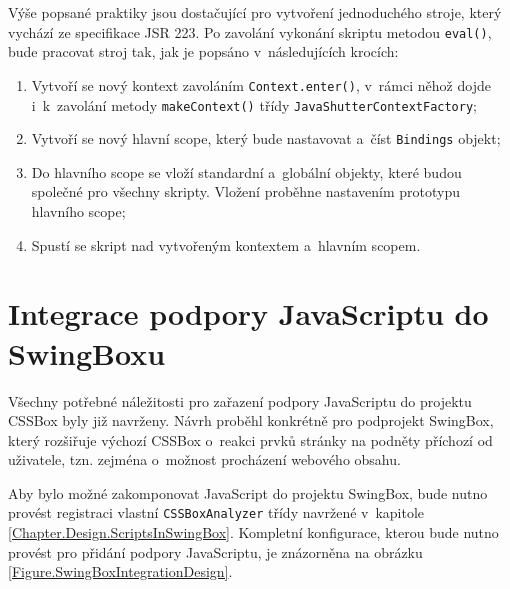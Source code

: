 Výše popsané praktiky jsou dostačující pro vytvoření jednoduchého stroje, který vychází ze specifikace JSR 223.  Po zavolání vykonání skriptu metodou \texttt{eval()}, bude pracovat stroj tak, jak je popsáno v~následujících krocích:  

\begin{enumerate}
  \item	Vytvoří se nový kontext zavoláním \texttt{Context.enter()}, v~rámci něhož dojde i~k~zavolání metody \texttt{makeContext()} třídy \texttt{JavaShutterContextFactory};
  \item	Vytvoří se nový hlavní scope, který bude nastavovat a~číst \texttt{Bindings} objekt;
  \item	Do hlavního scope  se vloží standardní a~globální objekty, které budou společné pro všechny skripty. Vložení proběhne nastavením prototypu hlavního scope;
  \item	Spustí se skript nad vytvořeným kontextem a~hlavním scopem.
\end{enumerate}

\section{Integrace podpory JavaScriptu do SwingBoxu}
\label{Chapter.Design.SwingBoxIntegration}

Všechny potřebné náležitosti pro zařazení podpory JavaScriptu do projektu CSSBox byly již navrženy. Návrh proběhl konkrétně pro podprojekt SwingBox, který rozšiřuje výchozí  CSSBox o~reakci prvků stránky na podněty příchozí od uživatele, tzn. zejména o~možnost procházení webového obsahu. 

Aby bylo možné zakomponovat JavaScript do projektu SwingBox, bude nutno provést registraci vlastní \texttt{CSSBoxAnalyzer} třídy navržené v~kapitole \ref{Chapter.Design.ScriptsInSwingBox}. Kompletní konfigurace, kterou bude nutno provést pro přidání podpory JavaScriptu, je znázorněna na obrázku \ref{Figure.SwingBoxIntegrationDesign}.

